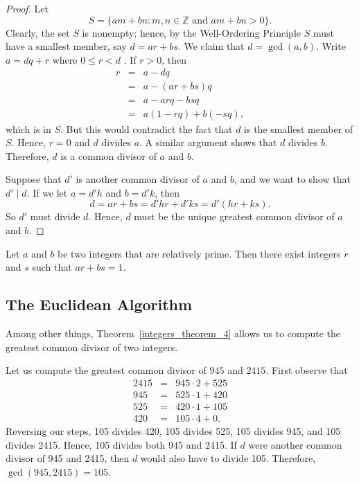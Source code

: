 \begin{proof}
Let
$$
S = \{ am + bn : m, n \in {\mathbb Z} \mbox{ and } am + bn	> 0 \}.
$$
Clearly, the set $S$ is nonempty; hence, by the Well-Ordering Principle $S$ must have a smallest member, say $d = ar + bs$.  We claim that $d = \gcd( a, b)$.  Write $a = dq + r$ where $0 \leq r < d$ . If $r > 0$, then 
\begin{eqnarray*}
r 
& = & a - dq \\
& = & a - (ar + bs)q \\
& = & a - arq - bsq \\
& = & a( 1 - rq ) + b( -sq ),
\end{eqnarray*}
which is in $S$.  But this would contradict the fact that $d$ is the smallest member of $S$.  Hence, $r = 0$ and $d$ divides $a$.  A similar argument shows that $d$ divides $b$.  Therefore, $d$ is a common divisor of $a$ and $b$.

Suppose that $d'$ is another common divisor of $a$ and $b$, and we want to show that $d' \mid d$. If we let $a = d'h$ and $b = d'k$, then
$$
d = ar + bs = d'hr + d'ks = d'(hr + ks).
$$
So $d'$ must divide $d$. Hence, $d$ must be the unique greatest common divisor of $a$ and $b$. 
\end{proof}

\begin{corollary}\label{integers_theorem_5}
Let $a$ and $b$ be two integers that are relatively prime. Then there exist  integers $r$ and $s$ such that $ar + bs = 1$. 
\end{corollary}
 
 
\subsection*{The Euclidean Algorithm}

Among other things, Theorem~\ref{integers_theorem_4} allows us to compute the greatest common divisor of two integers. 

\medskip

Let us compute the greatest common divisor of $945$ and $2415$.  First observe that 
\begin{eqnarray*}
2415 & = & 945 \cdot 2 + 525 \\
945 & = & 525 \cdot 1 + 420 \\
525 & = & 420 \cdot 1 + 105 \\
420 & = & 105 \cdot 4 + 0.
\end{eqnarray*}
Reversing our steps, 105 divides 420, 105 divides 525, 105 divides 945, and 105 divides 2415.  Hence, 105 divides both 945 and 2415.  If $d$ were another common divisor of 945 and 2415, then $d$ would also have to divide 105.  Therefore, $\gcd( 945, 2415 ) = 105$.

